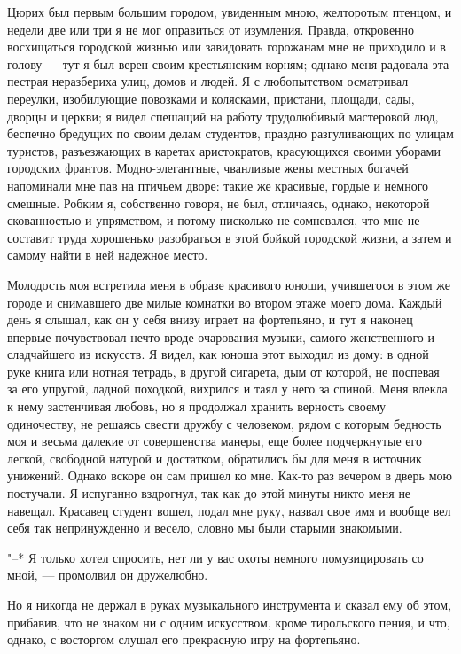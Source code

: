 Цюрих был первым большим  городом, увиденным мною, желторотым птенцом,
и  недели две  или  три  я не  мог  оправиться  от изумления.  Правда,
откровенно восхищаться  городской жизнью или завидовать  горожанам мне
не приходило и в голову --- тут я был верен своим крестьянским корням;
однако меня радовала эта пестрая неразбериха  улиц, домов и людей. Я с
любопытством осматривал  переулки, изобилующие повозками  и колясками,
пристани,  площади,  сады,  дворцы  и  церкви;  я  видел  спешащий  на
работу трудолюбивый  мастеровой люд, беспечно бредущих  по своим делам
студентов, праздно  разгуливающих по  улицам туристов,  разъезжающих в
каретах  аристократов, красующихся  своими уборами  городских франтов.
Модно-элегантные, чванливые жены местных богачей напоминали мне пав на
птичьем дворе: такие же красивые,  гордые и немного смешные. Робким я,
собственно говоря, не был, отличаясь, однако, некоторой скованностью и
упрямством,  и потому  нисколько не  сомневался, что  мне не  составит
труда хорошенько разобраться в этой  бойкой городской жизни, а затем и
самому найти в ней надежное место.

Молодость моя  встретила меня в  образе красивого юноши,  учившегося в
этом же городе  и снимавшего две милые комнатки во  втором этаже моего
дома. Каждый день я слышал, как  он у себя внизу играет на фортепьяно,
и тут  я наконец впервые  почувствовал нечто вроде  очарования музыки,
самого женственного и сладчайшего из искусств. Я видел, как юноша этот
выходил  из дому:  в одной  руке книга  или нотная  тетрадь, в  другой
сигарета, дым от которой, не поспевая за его упругой, ладной походкой,
вихрился  и таял  у него  за спиной.  Меня влекла  к нему  застенчивая
любовь, но я продолжал хранить верность своему одиночеству, не решаясь
свести  дружбу с  человеком, рядом  с  которым бедность  моя и  весьма
далекие  от совершенства  манеры, еще  более подчеркнутые  его легкой,
свободной  натурой и  достатком,  обратились бы  для  меня в  источник
унижений. Однако  вскоре он сам  пришел ко  мне. Как-то раз  вечером в
дверь мою  постучали. Я  испуганно вздрогнул, так  как до  этой минуты
никто меня не навещал. Красавец  студент вошел, подал мне руку, назвал
свое имя и вообще вел себя  так непринужденно и весело, словно мы были
старыми знакомыми.

"--*  Я   только  хотел   спросить,  нет  ли   у  вас   охоты  немного
помузицировать со мной, --- промолвил он дружелюбно.

Но я никогда  не держал в руках музыкального инструмента  и сказал ему
об  этом,  прибавив,  что  не  знаком ни  с  одним  искусством,  кроме
тирольского пения,  и что, однако,  с восторгом слушал  его прекрасную
игру на фортепьяно.

